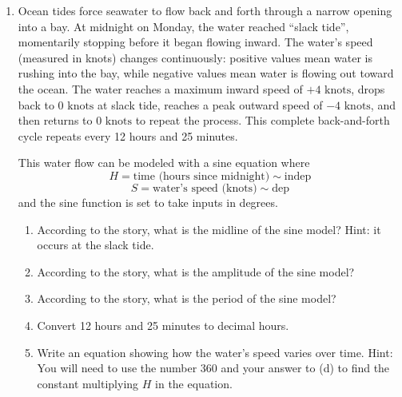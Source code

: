 \begin{enumerate}
\begin{enumerate}
    \item The car's engine run at $750\text{ RPM}$ which means revolutions (or up/down cycles) per minute.  Convert the units to explain why the car's engine runs at 12.5 cycles per second.
    \item How many seconds does it take for the piston to complete it's up/down cycle? This number is the period of the sine function.  Hint: it's less than 1 second.
    \item Which number in the equation is used to calculate the period?  Check that the period you calculate from the equation equals your answer from part (c).
    \item What does the constant 10 mean in the story and what are its units?
    \item What does the 4 mean in the story and what are its units?
    \item Draw a graph showing the height of the piston for the first 1 second.  
    \item Explain how to see 10, 4, and .08 on the graph.
\end{enumerate}


\item %

Ocean tides force seawater to flow back and forth through a narrow opening into a bay. At midnight on Monday, the water reached ``slack tide'', momentarily stopping before it began flowing inward. The water's speed (measured in knots) changes continuously: positive values mean water is rushing into the bay, while negative values mean water is flowing out toward the ocean. The water reaches a maximum inward speed of $+4\text{ knots}$, drops back to $0\text{ knots}$ at slack tide, reaches a peak outward speed of $-4\text{ knots}$, and then returns to $0\text{ knots}$ to repeat the process. This complete back-and-forth cycle repeats every 12 hours and 25 minutes. 

This water flow can be modeled with a sine equation where 
$$H = \text{time (hours since midnight)} \sim \text{indep}$$
$$S = \text{water's speed (knots)} \sim \text{dep}$$
and the sine function is set to take inputs in degrees.

\begin{enumerate}
    \item According to the story, what is the midline of the sine model?  Hint: it occurs at the slack tide.
    \item According to the story, what is the amplitude of the sine model?
    \item According to the story, what is the period of the sine model?
    \item Convert 12 hours and 25 minutes to decimal hours.
    \item Write an equation showing how the water's speed varies over time.  Hint: You will need to use the number 360 and your answer to (d) to find the constant multiplying $H$ in the equation.
\end{enumerate}


\end{enumerate}

